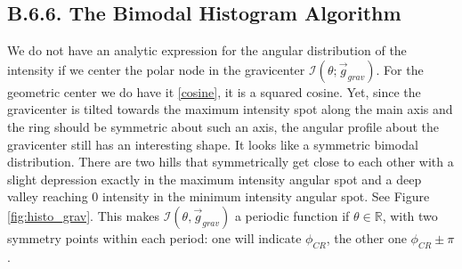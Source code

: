 \documentclass[11pt, a4paper, twoside]{article} %
\newcommand{\R}{\mathbb{R}} %
\begin{document}

\subsection*{B.6.6. The Bimodal Histogram Algorithm}
We do not have an analytic expression for the angular distribution of the intensity if we center the polar node in the gravicenter $\mathcal{I}(\theta;\vec{g}_{grav})$. For the geometric center we do have it \eqref{cosine}, it is a squared cosine. Yet, since the gravicenter is tilted towards the maximum intensity spot along the main axis and the ring should be symmetric about such an axis, the angular profile about the gravicenter still has an interesting shape. It looks like a symmetric bimodal distribution. There are two hills that symmetrically get close to each other with a slight depression exactly in the maximum intensity angular spot and a deep valley reaching 0 intensity in the minimum intensity angular spot. See Figure \ref{fig:histo_grav}. This makes $\mathcal{I}(\theta,\vec{g}_{grav})$ a periodic function if $\theta\in\R$, with two symmetry points within each period: one will indicate $\phi_{CR}$, the other one $\phi_{CR}\pm\pi$.
\end{document}
